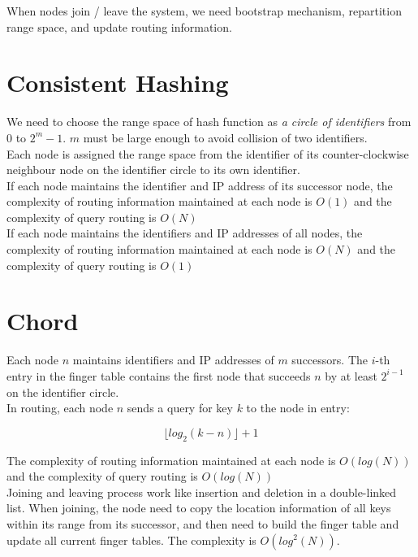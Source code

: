 \begin{multicols*}{2}
\noindent When nodes join / leave the system, we need bootstrap mechanism, repartition range space, and update routing information.

\section{Consistent Hashing}

\noindent We need to choose the range space of hash function as \emph{a circle of identifiers} from $0$ to $2^m -1$. $m$ must be large enough to avoid collision of two identifiers. \\

\noindent Each node is assigned the range space from the identifier of its counter-clockwise neighbour node on the identifier circle to its own identifier.\\

\noindent If each node maintains the identifier and IP address of its successor node, the complexity of routing information maintained at each node is $O(1)$ and the complexity of query routing is $O(N)$\\

\noindent If each node maintains the identifiers and IP addresses of all nodes, the complexity of routing information maintained at each node is $O(N)$ and the complexity of query routing is $O(1)$

\section{Chord}

\noindent Each node $n$ maintains identifiers and IP addresses of $m$ successors. The $i$-th entry in the finger table contains the first node that succeeds $n$ by at least $2^{i-1}$ on the identifier circle. \\

\noindent In routing, each node $n$ sends a query for key $k$ to the node in entry:

$$\lfloor log_2(k-n) \rfloor + 1$$

\noindent The complexity of routing information maintained at each node is $O(log(N))$ and the complexity of query routing is $O(log(N))$\\

\noindent Joining and leaving process work like insertion and deletion in a double-linked list. When joining, the node need to copy the location information of all keys within its range from its successor, and then need to build the finger table and update all current finger tables. The complexity is $O(log^2(N))$.


\end{multicols*}
